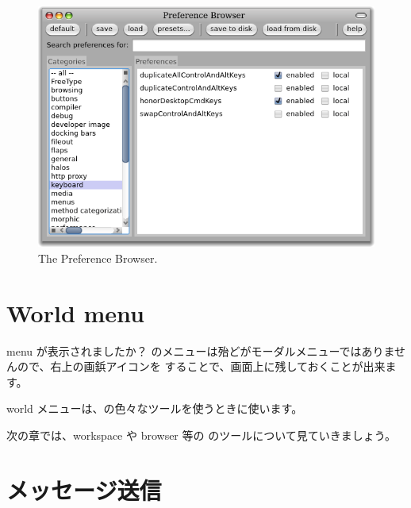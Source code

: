 \documentclass[a4paper,10pt,twoside]{book}
\begin{document}
\begin{figure}[htb]
\centerline{\includegraphics[width=\textwidth]{PreferenceBrowser}}
\caption{The Preference Browser.}
\end{figure}


\section{World menu}

 menu が表示されましたか？
\pharo のメニューは殆どがモーダルメニューではありませんので、右上の画鋲アイコンを \click することで、画面上に残しておくことが出来ます。

world メニューは、\pharo の色々なツールを使うときに使います。


次の章では、workspace や browser 等の \pharo のツールについて見ていきましょう。

\section{メッセージ送信}
\end{document}

